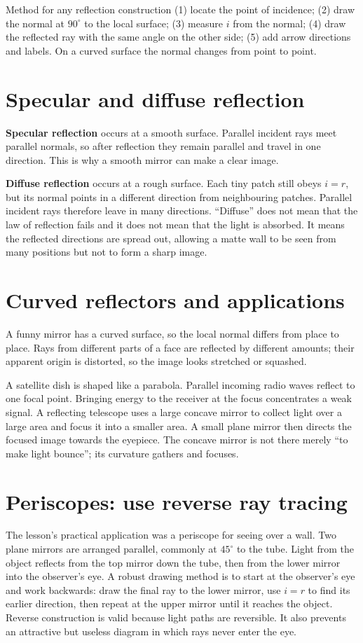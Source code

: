 \documentclass[10pt,a4paper]{article}
\begin{document}
\begin{keybox}{Method for any reflection construction}
(1) locate the point of incidence; (2) draw the normal at $90^\circ$ to the local surface; (3) measure $i$ from the normal; (4) draw the reflected ray with the same angle on the other side; (5) add arrow directions and labels. On a curved surface the normal changes from point to point.
\end{keybox}

\section{Specular and diffuse reflection}
\textbf{Specular reflection} occurs at a smooth surface. Parallel incident rays meet parallel normals, so after reflection they remain parallel and travel in one direction. This is why a smooth mirror can make a clear image.

\textbf{Diffuse reflection} occurs at a rough surface. Each tiny patch still obeys $i=r$, but its normal points in a different direction from neighbouring patches. Parallel incident rays therefore leave in many directions. ``Diffuse'' does not mean that the law of reflection fails and it does not mean that the light is absorbed. It means the reflected directions are spread out, allowing a matte wall to be seen from many positions but not to form a sharp image.

\section{Curved reflectors and applications}
A funny mirror has a curved surface, so the local normal differs from place to place. Rays from different parts of a face are reflected by different amounts; their apparent origin is distorted, so the image looks stretched or squashed.

A satellite dish is shaped like a parabola. Parallel incoming radio waves reflect to one focal point. Bringing energy to the receiver at the focus concentrates a weak signal. A reflecting telescope uses a large concave mirror to collect light over a large area and focus it into a smaller area. A small plane mirror then directs the focused image towards the eyepiece. The concave mirror is not there merely ``to make light bounce''; its curvature gathers and focuses.

\section{Periscopes: use reverse ray tracing}
The lesson’s practical application was a periscope for seeing over a wall. Two plane mirrors are arranged parallel, commonly at $45^\circ$ to the tube. Light from the object reflects from the top mirror down the tube, then from the lower mirror into the observer’s eye. A robust drawing method is to start at the observer’s eye and work backwards: draw the final ray to the lower mirror, use $i=r$ to find its earlier direction, then repeat at the upper mirror until it reaches the object. Reverse construction is valid because light paths are reversible. It also prevents an attractive but useless diagram in which rays never enter the eye.
\end{document}
